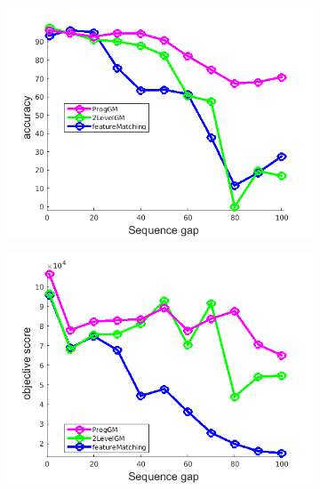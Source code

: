 \documentclass[
	fontsize=12pt,
	paper=a4,
	twoside=false,
	numbers=noenddot,
	plainheadsepline,
	toc=listof,
	toc=bibliography
]{scrartcl}
\begin{document}
\begin{figure}[h] 
	\begin{subfigure}[b]{0.3\textwidth}
		\centering
		\includegraphics[scale=0.25]{"fig_ver2608/RealImages/House_seq/no_descr/using_cdf_afftrafo/ext_solution/performance/accuracy"} 
	\end{subfigure}%
	\begin{subfigure}[b]{0.3\textwidth}
		\centering
		\includegraphics[scale=0.25]{"fig_ver2608/RealImages/House_seq/no_descr/using_cdf_afftrafo/ext_solution/performance/score"}  
	\end{subfigure} 
	\begin{subfigure}[b]{0.3\textwidth}
		\centering

\end{subfigure}
\end{figure}
\end{document}
